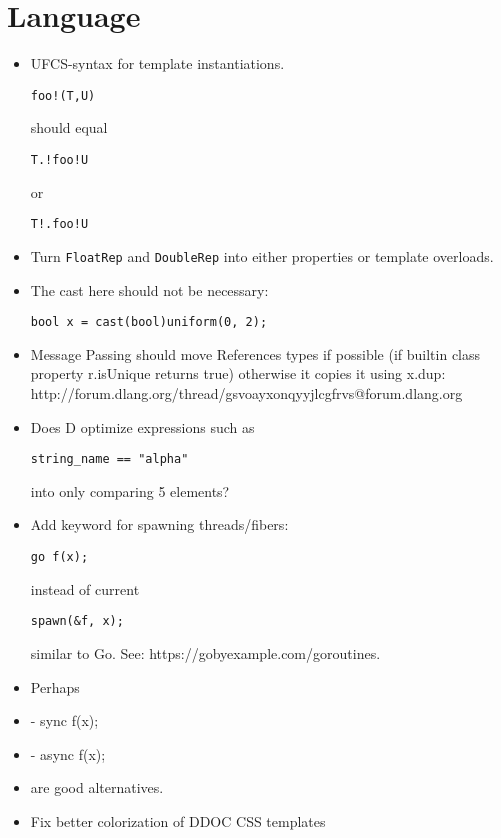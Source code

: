 \documentclass[xcolor=dvipsnames, twocolumn]{article}
\begin{document}
\section{Language}

\begin{itemize}

\item UFCS-syntax for template instantiations.
\begin{lstlisting}[frame=single]
foo!(T,U)
\end{lstlisting}

should equal

\begin{lstlisting}[frame=single]
T.!foo!U
\end{lstlisting}

or

\begin{lstlisting}[frame=single]
T!.foo!U
\end{lstlisting}

\item Turn \texttt{FloatRep} and \texttt{DoubleRep} into either properties or
  template overloads.

\item The cast here should not be necessary:
\begin{lstlisting}[frame=single]
bool x = cast(bool)uniform(0, 2);
\end{lstlisting}

\item Message Passing should move References types if possible (if builtin class
  property r.isUnique returns true) otherwise it copies it using x.dup:
  http://forum.dlang.org/thread/gsvoayxonqyyjlcgfrvs@forum.dlang.org

\item Does D optimize expressions such as
\begin{lstlisting}[frame=single]
string_name == "alpha"
\end{lstlisting}
into only comparing 5 elements?

\item Add keyword for spawning threads/fibers:
\begin{lstlisting}[frame=single]
go f(x);
\end{lstlisting}
instead of current
\begin{lstlisting}[frame=single]
spawn(&f, x);
\end{lstlisting}
similar to Go. See: https://gobyexample.com/goroutines.

\item Perhaps
\item - sync f(x);
\item - async f(x);
\item are good alternatives.

\item Fix better colorization of DDOC CSS templates

\end{itemize}
\end{document}
